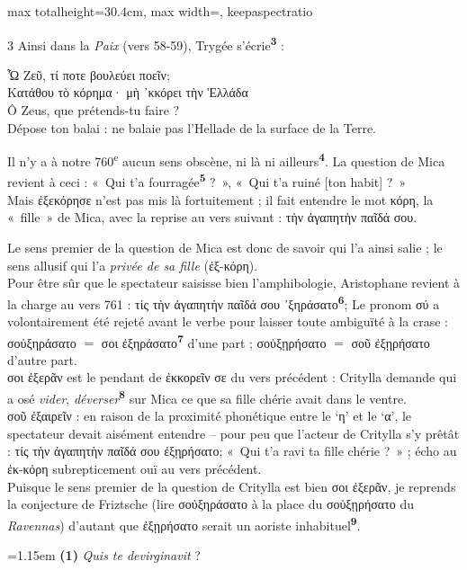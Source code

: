 \documentclass[11pt,twoside]{book}
\newcommand{\italique}[1]{\textit{#1}}
\newcommand{\citComm}[1]{\begin{quoting}[vskip=0.4pt,leftmargin=0.7em,rightmargin=0.2em]#1\end{quoting}}
\newcommand{\nieme}[1]{#1\textsuperscript{e}}
\newcommand{\francais}[1]{{\policeFr #1}}
\newcommand{\latin}[1]{\textit{#1}}
\newcommand{\marqueur}[1]{\textsuperscript{\color{rubricRed}\textbf{#1}}}
\begin{document}
\begin{adjustbox}{max totalheight=30.4cm, max width=\textwidth, keepaspectratio}
\begin{minipage}{\textwidth}
{\begin{multicols}{3}
\noindent Ainsi dans la \italique{Paix} (vers 58-59), Trygée s'écrie\marqueur{3} :
\citComm{Ὦ Ζεῦ, τί ποτε βουλεύει ποεῖν;\\
Κατάθου τὸ κόρημα· μὴ ᾽κκόρει τὴν Ἑλλάδα\\
\francais{Ô Zeus, que prétends-tu faire ?\\
Dépose ton balai : ne balaie pas l'Hellade de la surface de la Terre.}}
\par\vspace{1.5pt}
\noindent Il n'y a à notre \nieme{760} aucun sens obscène, ni là ni ailleurs\marqueur{4}. La question de Mica revient à ceci : «~Qui t'a fourragée\marqueur{5} ?~», «~Qui t'a ruiné [ton habit] ?~»\\ Mais ἐξεκόρησε n'est pas mis là fortuitement ; il fait entendre le mot κόρη, la «~fille~» de Mica, avec la reprise au vers suivant : τὴν ἀγαπητὴν παῖδά σου.
\par\vspace{1.5pt}
\noindent Le sens premier de la question de Mica est donc de savoir qui l'a ainsi salie ; le sens allusif qui l'a \italique{privée de sa fille} (ἐξ-κόρη).\\ Pour être sûr que le spectateur saisisse bien l'amphibologie, Aristophane revient à la charge au vers 761 : τίς τὴν ἀγαπητὴν παῖδά σου ᾿ξηράσατο\marqueur{6}; Le pronom σύ a volontairement été rejeté avant le verbe pour laisser toute ambiguïté à la crase : σοὐξηράσατο $=$ σοι ἐξηράσατο\marqueur{7} d'une part ; σοὐξῃρήσατο $=$ σοῦ ἐξῃρήσατο d'autre part.\\ σοι ἐξερᾶν est le pendant de ἐκκορεῖν σε du vers précédent : Critylla demande qui a osé \italique{vider}, \italique{déverser}\marqueur{8} sur Mica ce que sa fille chérie avait dans le ventre.\\ σοῦ ἐξαιρεῖν : en raison de la proximité phonétique entre le `η' et le `α', le spectateur devait aisément entendre -- pour peu que l'acteur de Critylla s'y prêtât : τίς τὴν ἀγαπητὴν παῖδά σου ἐξῃρήσατο; «~Qui t'a ravi ta fille chérie ?~» ; écho au ἐκ-κόρη subrepticement ouï au vers précédent.\\ Puisque le sens premier de la question de Critylla  est bien σοι ἐξερᾶν, je reprends la conjecture de Friztsche (lire σοὐξηράσατο à la place du σοὐξῃρήσατο du \italique{Ravennas}) d'autant que ἐξῃρήσατο serait un aoriste inhabituel\marqueur{9}.
\par\vspace{1.5pt}
\par\vspace{1.2pt}\par\nopagebreak\vspace{1pt}\noindent\hangindent=1.15em {\color{sepiaNote}\textbf{(1)}} \latin{Quis te devirginavit} ?

\end{multicols}}
\end{minipage}
\end{adjustbox}
\end{document}
